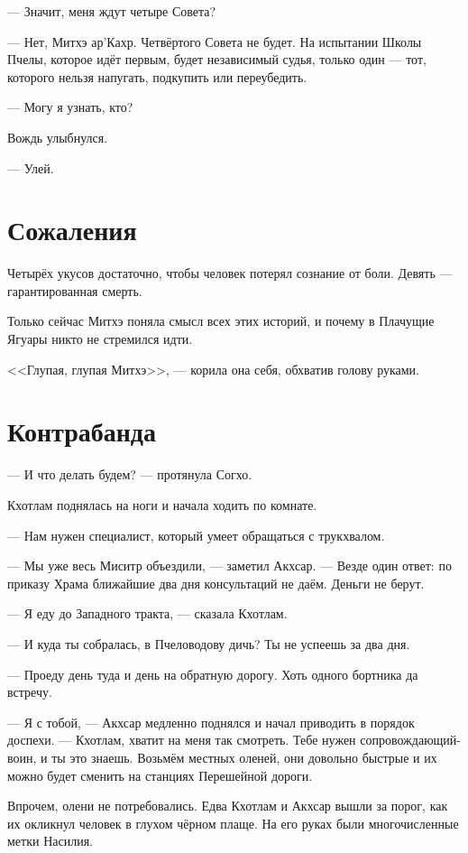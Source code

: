 --- Значит, меня ждут четыре Совета?

--- Нет, Митхэ ар'Кахр.
Четвёртого Совета не будет.
На испытании Школы Пчелы, которое идёт первым, будет независимый судья, только один --- тот, которого нельзя напугать, подкупить или переубедить.

--- Могу я узнать, кто?

Вождь улыбнулся.

--- Улей.

\section{Сожаления}

Четырёх укусов достаточно, чтобы человек потерял сознание от боли.
Девять --- гарантированная смерть.

Только сейчас Митхэ поняла смысл всех этих историй, и почему в Плачущие Ягуары никто не стремился идти.

<<Глупая, глупая Митхэ>>, --- корила она себя, обхватив голову руками.

\textspace

\section{Контрабанда}

--- И что делать будем? --- протянула Согхо.

Кхотлам поднялась на ноги и начала ходить по комнате.

--- Нам нужен специалист, который умеет обращаться с трукхвалом.

--- Мы уже весь Миситр объездили, --- заметил Акхсар.
--- Везде один ответ: по приказу Храма ближайшие два дня консультаций не даём.
Деньги не берут.

--- Я еду до Западного тракта, --- сказала Кхотлам.

--- И куда ты собралась, в Пчеловодову дичь?
Ты не успеешь за два дня.

--- Проеду день туда и день на обратную дорогу.
Хоть одного бортника да встречу.

--- Я с тобой, --- Акхсар медленно поднялся и начал приводить в порядок доспехи.
--- Кхотлам, хватит на меня так смотреть.
Тебе нужен сопровождающий-воин, и ты это знаешь.
Возьмём местных оленей, они довольно быстрые и их можно будет сменить на станциях Перешейной дороги.

Впрочем, олени не потребовались.
Едва Кхотлам и Акхсар вышли за порог, как их окликнул человек в глухом чёрном плаще.
На его руках были многочисленные метки Насилия.

